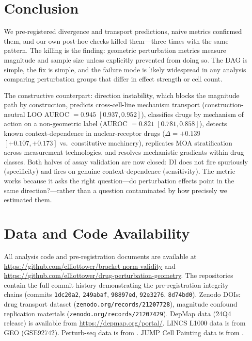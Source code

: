 \documentclass[11pt]{article}
\begin{document}
\section{Conclusion}

We pre-registered divergence and transport predictions, naive metrics
confirmed them, and our own post-hoc checks killed them---three times
with the same pattern. The killing is the finding: geometric
perturbation metrics measure magnitude and sample size unless explicitly
prevented from doing so. The DAG is simple, the fix is simple, and the
failure mode is likely widespread in any analysis comparing perturbation
groups that differ in effect strength or cell count.

The constructive counterpart: direction instability, which blocks the
magnitude path by construction, predicts cross-cell-line mechanism
transport (construction-neutral LOO AUROC $= 0.945$ $[0.937, 0.952]$),
classifies drugs by mechanism of action on a non-geometric label
(AUROC $= 0.821$ $[0.781, 0.858]$), detects known context-dependence
in nuclear-receptor drugs ($\Delta = +0.139$ $[+0.107, +0.173]$ vs.\
constitutive machinery), replicates MOA stratification across
measurement technologies, and resolves mechanistic gradients within drug
classes. Both halves of assay validation are now closed: DI does not
fire spuriously (specificity) and fires on genuine context-dependence
(sensitivity). The metric works because it asks the right question---do
perturbation effects point in the same direction?---rather than a
question contaminated by how precisely we estimated them.

\section*{Data and Code Availability}

All analysis code and pre-registration documents are available at
\url{https://github.com/elliottower/bracket-norm-validity} and
\url{https://github.com/elliottower/drug-perturbation-geometry}.
The repositories contain the full commit history demonstrating the
pre-registration integrity chains (commits \texttt{1dc20a2},
\texttt{249abaf}, \texttt{98897ed}, \texttt{92e3276}, \texttt{8d74bd0}).
Zenodo DOIs: drug transport dataset
(\texttt{zenodo.org/records/21207728}), magnitude confound replication
materials (\texttt{zenodo.org/records/21207429}).
DepMap data (24Q4 release) is available from
\url{https://depmap.org/portal/}. LINCS L1000 data is from GEO
(GSE92742). Perturb-seq data is from \citet{replogle2022mapping}. JUMP
Cell Painting data is from \citet{chandrasekaran2023jump}.
\end{document}
